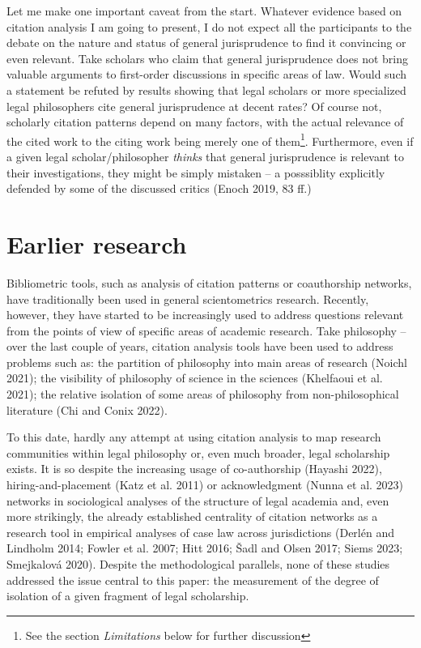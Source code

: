 \documentclass[
]{article}
\begin{document}
Let me make one important caveat from the start. Whatever evidence based on citation analysis I am going to present, I do not expect all the participants to the debate on the nature and status of general jurisprudence to find it convincing or even relevant. Take scholars who claim that general jurisprudence does not bring valuable arguments to first-order discussions in specific areas of law. Would such a statement be refuted by results showing that legal scholars or more specialized legal philosophers cite general jurisprudence at decent rates? Of course not, scholarly citation patterns depend on many factors, with the actual relevance of the cited work to the citing work being merely one of them\footnote{See the section \emph{Limitations} below for further discussion}. Furthermore, even if a given legal scholar/philosopher \emph{thinks} that general jurisprudence is relevant to their investigations, they might be simply mistaken -- a posssiblity explicitly defended by some of the discussed critics (Enoch 2019, 83 ff.)

\hypertarget{earlier-research}{%
\section{Earlier research}\label{earlier-research}}

Bibliometric tools, such as analysis of citation patterns or coauthorship networks, have traditionally been used in general scientometrics research. Recently, however, they have started to be increasingly used to address questions relevant from the points of view of specific areas of academic research. Take philosophy -- over the last couple of years, citation analysis tools have been used to address problems such as: the partition of philosophy into main areas of research (Noichl 2021); the visibility of philosophy of science in the sciences (Khelfaoui et al. 2021); the relative isolation of some areas of philosophy from non-philosophical literature (Chi and Conix 2022).

To this date, hardly any attempt at using citation analysis to map research communities within legal philosophy or, even much broader, legal scholarship exists. It is so despite the increasing usage of co-authorship (Hayashi 2022), hiring-and-placement (Katz et al. 2011) or acknowledgment (Nunna et al. 2023) networks in sociological analyses of the structure of legal academia and, even more strikingly, the already established centrality of citation networks as a research tool in empirical analyses of case law across jurisdictions (Derlén and Lindholm 2014; Fowler et al. 2007; Hitt 2016; Šadl and Olsen 2017; Siems 2023; Smejkalová 2020). Despite the methodological parallels, none of these studies addressed the issue central to this paper: the measurement of the degree of isolation of a given fragment of legal scholarship.
\end{document}
